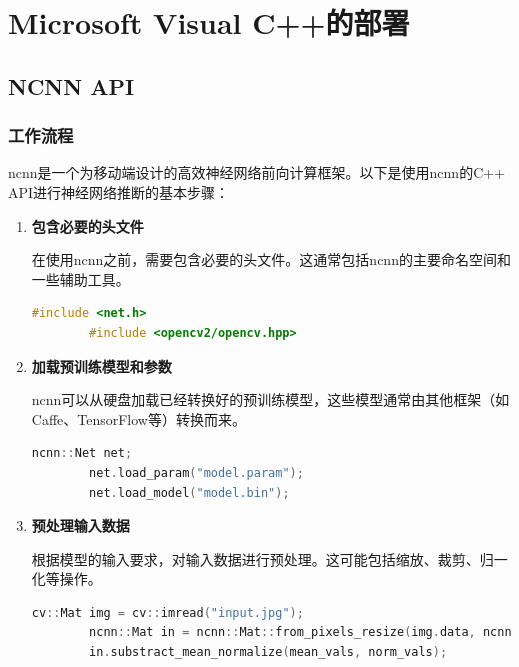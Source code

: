 \chapter{Microsoft Visual C++的部署}
\label{chapter:8}

\section{NCNN API}

\subsection{工作流程}

ncnn是一个为移动端设计的高效神经网络前向计算框架。以下是使用ncnn的C++ API进行神经网络推断的基本步骤：

\begin{enumerate}

	\item \textbf{包含必要的头文件}

	在使用ncnn之前，需要包含必要的头文件。这通常包括ncnn的主要命名空间和一些辅助工具。

	\begin{lstlisting}[caption={导入OpenCV与NCNN},language=C++]
		#include <net.h>
		#include <opencv2/opencv.hpp>
	\end{lstlisting}

	\item \textbf{加载预训练模型和参数}

	ncnn可以从硬盘加载已经转换好的预训练模型，这些模型通常由其他框架（如Caffe、TensorFlow等）转换而来。

	\begin{lstlisting}[caption={加载权重文件},language=C++]
		ncnn::Net net;
		net.load_param("model.param");
		net.load_model("model.bin");
	\end{lstlisting}

	\item \textbf{预处理输入数据}

	根据模型的输入要求，对输入数据进行预处理。这可能包括缩放、裁剪、归一化等操作。

	\begin{lstlisting}[caption={读取图片并处理数据},language=C++]
		cv::Mat img = cv::imread("input.jpg");
		ncnn::Mat in = ncnn::Mat::from_pixels_resize(img.data, ncnn::Mat::PIXEL_BGR, img.cols, img.rows, model_input_width, model_input_height);
		in.substract_mean_normalize(mean_vals, norm_vals);
	\end{lstlisting}


\end{enumerate}
